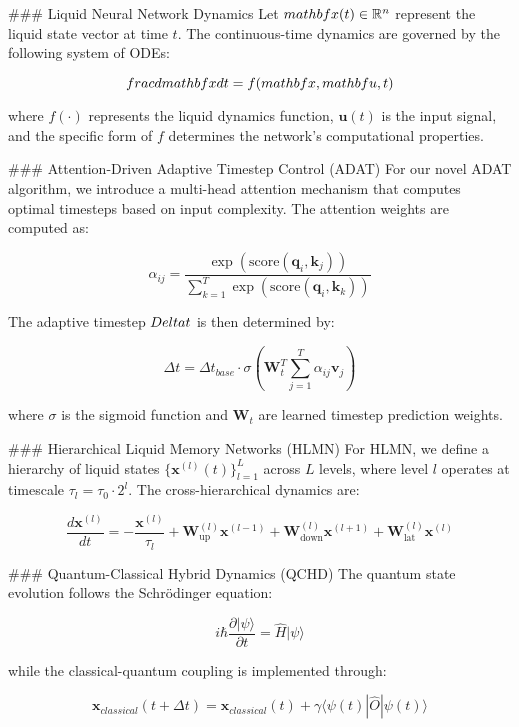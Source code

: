 \documentclass[conference]{IEEEtran}
\begin{document}
### Liquid Neural Network Dynamics
Let $\\mathbf{x}(t) \in \mathbb{R}^n$ represent the liquid state vector 
at time $t$. The continuous-time dynamics are governed by the following system of ODEs:

$$\\frac{d\\mathbf{x}}{dt} = f(\\mathbf{x}, \\mathbf{u}, t)$$

where $f(\cdot)$ represents the liquid dynamics function, $\mathbf{u}(t)$ is the input signal, 
and the specific form of $f$ determines the network's computational properties.

### Attention-Driven Adaptive Timestep Control (ADAT)
For our novel ADAT algorithm, we introduce a multi-head attention mechanism that computes 
optimal timesteps based on input complexity. The attention weights are computed as:

$$\alpha_{ij} = \frac{\exp(\text{score}(\mathbf{q}_i, \mathbf{k}_j))}{\sum_{k=1}^T \exp(\text{score}(\mathbf{q}_i, \mathbf{k}_k))}$$

The adaptive timestep $\\Delta t$ is then determined by:

$$\Delta t = \Delta t_{base} \cdot \sigma\left(\mathbf{W}_t^T \sum_{j=1}^T \alpha_{ij} \mathbf{v}_j\right)$$

where $\sigma$ is the sigmoid function and $\mathbf{W}_t$ are learned timestep prediction weights.

### Hierarchical Liquid Memory Networks (HLMN)
For HLMN, we define a hierarchy of liquid states $\{\mathbf{x}^{(l)}(t)\}_{l=1}^L$ across $L$ levels, 
where level $l$ operates at timescale $\tau_l = \tau_0 \cdot 2^l$. The cross-hierarchical dynamics are:

$$\frac{d\mathbf{x}^{(l)}}{dt} = -\frac{\mathbf{x}^{(l)}}{\tau_l} + \mathbf{W}_{\text{up}}^{(l)} \mathbf{x}^{(l-1)} + \mathbf{W}_{\text{down}}^{(l)} \mathbf{x}^{(l+1)} + \mathbf{W}_{\text{lat}}^{(l)} \mathbf{x}^{(l)}$$

### Quantum-Classical Hybrid Dynamics (QCHD)
The quantum state evolution follows the Schrödinger equation:

$$i\hbar \frac{\partial |\psi\rangle}{\partial t} = \hat{H} |\psi\rangle$$

while the classical-quantum coupling is implemented through:

$$\mathbf{x}_{classical}(t+\Delta t) = \mathbf{x}_{classical}(t) + \gamma \langle \psi(t) | \hat{O} | \psi(t) \rangle$$
\end{document}
